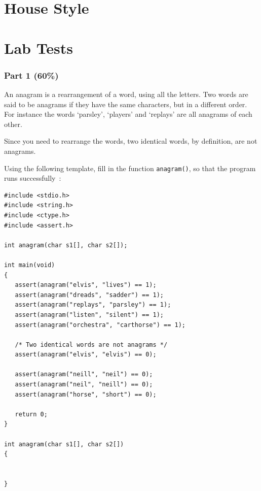 \appendix
\begin{appendices}

\chapter{House Style}



\chapter{Lab Tests}





\newpage
{}
\subsection*{Part 1 (60\%)}

An anagram is a rearrangement of a word, using all the letters.
Two words are said to be anagrams if they have the same characters,
but in a different order.
For instance the words `parsley', `players' and `replays'
are all anagrams of each other.

Since you need to rearrange the words, two identical words, by definition, are not anagrams.

Using the following template, fill in the function \verb^anagram()^,
so that the program runs successfully~:
\begin{verbatim}
#include <stdio.h>
#include <string.h>
#include <ctype.h>
#include <assert.h>

int anagram(char s1[], char s2[]);

int main(void)
{
   assert(anagram("elvis", "lives") == 1);
   assert(anagram("dreads", "sadder") == 1);
   assert(anagram("replays", "parsley") == 1);
   assert(anagram("listen", "silent") == 1);
   assert(anagram("orchestra", "carthorse") == 1);

   /* Two identical words are not anagrams */
   assert(anagram("elvis", "elvis") == 0);

   assert(anagram("neill", "neil") == 0);
   assert(anagram("neil", "neill") == 0);
   assert(anagram("horse", "short") == 0);

   return 0;
}

int anagram(char s1[], char s2[])
{


}
\end{verbatim} 


\end{appendices}
